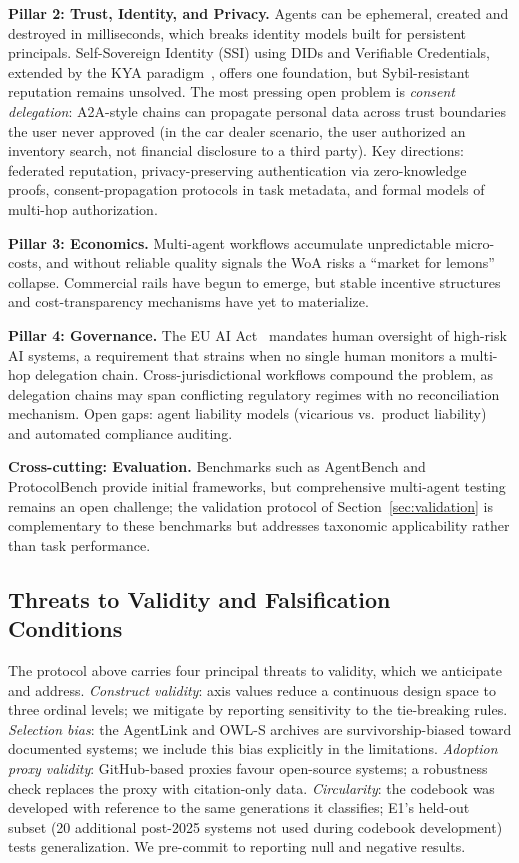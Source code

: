 \documentclass{IEEEcsmag}
\begin{document}
\textbf{Pillar 2: Trust, Identity, and Privacy.}  Agents can be ephemeral, created and destroyed in milliseconds, which breaks identity models built for persistent principals.  Self-Sovereign Identity (SSI) using DIDs and Verifiable Credentials, extended by the KYA paradigm~\cite{KYA_Paradigm_2025}, offers one foundation, but Sybil-resistant reputation remains unsolved.  The most pressing open problem is \emph{consent delegation}: A2A-style chains can propagate personal data across trust boundaries the user never approved (in the car dealer scenario, the user authorized an inventory search, not financial disclosure to a third party).  Key directions: federated reputation, privacy-preserving authentication via zero-knowledge proofs, consent-propagation protocols in task metadata, and formal models of multi-hop authorization.

\textbf{Pillar 3: Economics.}  Multi-agent workflows accumulate unpredictable micro-costs, and without reliable quality signals the WoA risks a ``market for lemons'' collapse.  Commercial rails have begun to emerge, but stable incentive structures and cost-transparency mechanisms have yet to materialize.

\textbf{Pillar 4: Governance.}  The EU AI Act~\cite{EUAI_2024} mandates human oversight of high-risk AI systems, a requirement that strains when no single human monitors a multi-hop delegation chain.  Cross-jurisdictional workflows compound the problem, as delegation chains may span conflicting regulatory regimes with no reconciliation mechanism.  Open gaps: agent liability models (vicarious vs.\ product liability) and automated compliance auditing.

\textbf{Cross-cutting: Evaluation.}  Benchmarks such as AgentBench and ProtocolBench provide initial frameworks, but comprehensive multi-agent testing remains an open challenge; the validation protocol of Section~\ref{sec:validation} is complementary to these benchmarks but addresses taxonomic applicability rather than task performance.

\subsection{Threats to Validity and Falsification Conditions}

The protocol above carries four principal threats to validity, which we anticipate and address.  \emph{Construct validity}: axis values reduce a continuous design space to three ordinal levels; we mitigate by reporting sensitivity to the tie-breaking rules.  \emph{Selection bias}: the AgentLink and OWL-S archives are survivorship-biased toward documented systems; we include this bias explicitly in the limitations.  \emph{Adoption proxy validity}: GitHub-based proxies favour open-source systems; a robustness check replaces the proxy with citation-only data.  \emph{Circularity}: the codebook was developed with reference to the same generations it classifies; E1's held-out subset (20 additional post-2025 systems not used during codebook development) tests generalization.  We pre-commit to reporting null and negative results.
\end{document}
